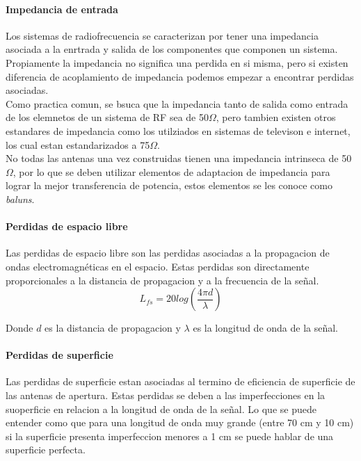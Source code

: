 \paragraph{Impedancia de entrada}

Los sistemas de radiofrecuencia se caracterizan por tener una impedancia asociada a la enrtrada y salida de los componentes que componen un sistema. Propiamente la impedancia no significa una perdida en si misma, pero si existen diferencia de acoplamiento de impedancia podemos empezar a encontrar perdidas asociadas.\\

Como practica comun, se bsuca que la impedancia tanto de salida como entrada de los elemnetos de un sistema de RF sea de 50$\Omega$, pero tambien existen otros estandares de impedancia como los utilziados en sistemas de televison e internet, los cual estan estandarizados a 75$\Omega$.\\

No todas las antenas una vez construidas tienen una impedancia intrinseca de 50$\Omega$, por lo que se deben utilizar elementos de adaptacion de impedancia para lograr la mejor transferencia de potencia, estos elementos se les conoce como \textit{baluns}.\\

\paragraph{Perdidas de espacio libre}

Las perdidas de espacio libre son las perdidas asociadas a la propagacion de ondas electromagnéticas en el espacio. Estas perdidas son directamente proporcionales a la distancia de propagacion y a la frecuencia de la señal.\\

\begin{equation}
    L_{fs} = 20log\left(\frac{4\pi d}{\lambda}\right)
\end{equation}

Donde $d$ es la distancia de propagacion y $\lambda$ es la longitud de onda de la señal.\\

\paragraph{Perdidas de superficie}

Las perdidas de superficie estan asociadas al termino de eficiencia de superficie de las antenas de apertura. Estas perdidas se deben a las imperfecciones en la suoperficie en relacion a la longitud de onda de la señal. Lo que se puede entender como que para una longitud de onda muy grande (entre 70 cm y 10 cm) si la superficie presenta imperfeccion menores a 1 cm se puede hablar de una superficie perfecta.\\


